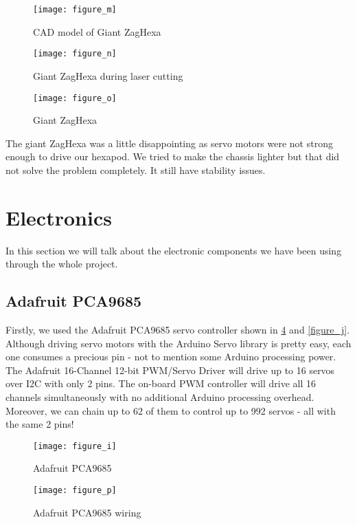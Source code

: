 \begin{figure}[h]
	\centering
	\texttt{[image: figure\_m]}
	\caption{CAD model of Giant ZagHexa}
	\label{figure_m}
\end{figure}

\begin{figure}[h]
	\centering
	\texttt{[image: figure\_n]}
	\caption{Giant ZagHexa during laser cutting}
	\label{figure_n}
\end{figure}

\begin{figure}[h]
	\centering
	\texttt{[image: figure\_o]}
	\caption{Giant ZagHexa}
	\label{figure_o}
\end{figure}

The giant ZagHexa was a little disappointing as servo motors were not strong enough to drive our hexapod. We tried to make the chassis lighter but that did not solve the problem completely. It still have stability issues.

\section{Electronics}
In this section we will talk about the electronic components we have been using through the whole project.

\subsection{Adafruit PCA9685}
Firstly, we used the Adafruit PCA9685 servo controller shown in \ref{figure_i} and \ref{figure_j}. Although driving servo motors with the Arduino Servo library is pretty easy, each one consumes a precious pin - not to mention some Arduino processing power.  The Adafruit 16-Channel 12-bit PWM/Servo Driver will drive up to 16 servos over I2C with only 2 pins.  The on-board PWM controller will drive all 16 channels simultaneously with no additional Arduino processing overhead.  Moreover, we can chain up to 62 of them to control up to 992 servos - all with the same 2 pins!

\begin{figure}[h]
	\centering
	\texttt{[image: figure\_i]}
	\caption{Adafruit PCA9685}
	\label{figure_i}
\end{figure}

\begin{figure}[h]
	\centering
	\texttt{[image: figure\_p]}
	\caption{Adafruit PCA9685 wiring}
	\label{figure_p}
\end{figure}
